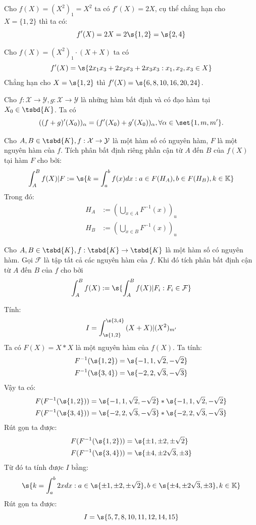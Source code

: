 \begin{example}
	Cho $f(X) = (X^2)_1 = X^2 $ ta có $f'(X) = 2X$, cụ thể chẳng hạn cho $X = \{1,2\}$ thì ta có:
	$$f'(X) = 2X = 2 \s{1,2} = \s{2,4}$$
\end{example}
\begin{example}
	Cho $f(X)= (X^2)_1\cdot (X+X)$ ta có \[f'(X) = \s{2x_1x_3+2x_2x_3+2x_3x_3 : x_1,x_2,x_3 \in X}\]
	Chẳng hạn cho $X=\s{1,2}$ thì $f'(X) = \s{6, 8, 10, 16, 20, 24}$.
\end{example}
\begin{theorem}
	Cho $f : \mathcal{X} \to \mathcal{Y}, g : \mathcal{X} \to \mathcal{Y}$ là những hàm bất định và có đạo hàm tại $X_0 \in \tsbd{K}$. Ta có \[
		((f+g)'(X_0))_\alpha = (f'(X_0) + g'(X_0))_\alpha, \forall \alpha \in \set{1,m,m'}.
	\]
\end{theorem}
\begin{definition}
	Cho $A,B \in \tsbd{K}, f: \mathcal{X} \to \mathcal{Y}$ là một hàm số có nguyên hàm, $F$ là một nguyên hàm của $f$. Tích phân bất định riêng phần cận từ $A$ đến $B$ của $f(X)$ tại hàm $F$ cho bởi:
	\[
		\int_{A}^{B}{f(X)|F} := \s{k = \int_{a}^{b}f(x)dx : a \in F(H_A), b \in F(H_B), k \in \mathbb{K}}
	\]
	Trong đó:
	\begin{align*}
		H_A &:= \left(\bigcup_{x \in A}{F^{-1}(x)}\right)_u \\
		H_B &:= \left(\bigcup_{x \in B}{F^{-1}(x)}\right)_u
	\end{align*}
\end{definition}
\begin{definition}
	Cho $A,B \in \tsbd{K}, f: \tsbd{K} \to \tsbd{K}$ là một hàm số có nguyên hàm. Gọi $\mathcal{F}$ là tập tất cả các nguyên hàm của $f$. Khi đó tích phân bất định cận từ $A$ đến $B$ của $f$ cho bởi\[
	\int_{A}^{B}{f(X)} := \s{\int_{A}^{B}f(X)|F_i : F_i \in \mathcal{F}}
	\]
\end{definition}
\begin{example}
	Tính: \[I = \int_{\s{1,2}}^{\s{3,4}}{(X+X)|(X^2)_{m'}}\]
	Ta có $F(X) = X*X$ là một nguyên hàm của $f(X)$. Ta tính:
	\begin{align*}
		F^{-1}(\s{1,2}) &= \s{-1,1,\sqrt{2},-\sqrt{2}} \\
		F^{-1}(\s{3,4}) &= \s{-2,2,\sqrt{3},-\sqrt{3}}
	\end{align*}
	Vậy ta có: 
	\begin{align*}
		F(F^{-1}(\s{1,2})) &= \s{-1,1,\sqrt{2},-\sqrt{2}} * \s{-1,1,\sqrt{2},-\sqrt{2}} \\
		F(F^{-1}(\s{3,4})) &= \s{-2,2,\sqrt{3},-\sqrt{3}} * \s{-2,2,\sqrt{3},-\sqrt{3}}
	\end{align*}
	Rút gọn ta được:
	\begin{align*}
		F(F^{-1}(\s{1,2})) &= \s{\pm 1, \pm 2, \pm \sqrt{2}} \\
		F(F^{-1}(\s{3,4})) &= \s{\pm 4, \pm 2\sqrt{3}, \pm 3}
	\end{align*}
	Từ đó ta tính được $I$ bằng:
	$$
		 \s{k = \int_{a}^{b}{2xdx}: a \in \s{\pm 1, \pm 2, \pm \sqrt{2}}, b \in  \s{\pm 4, \pm 2\sqrt{3}, \pm 3}, k \in \mathbb{K}}
	$$
	Rút gọn ta được:
	\[I = \s{5, 7, 8, 10, 11, 12, 14, 15}\]
\end{example}
